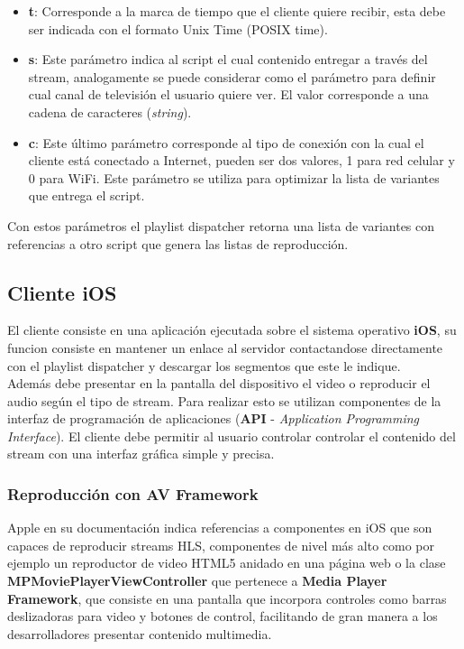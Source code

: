 \begin{itemize}
	\item \textbf{t}: Corresponde a la marca de tiempo que el cliente quiere recibir, esta debe ser indicada con el formato Unix Time (POSIX time).
	\item \textbf{s}: Este parámetro indica al script el cual contenido entregar a través del stream, analogamente se puede considerar como el parámetro para definir cual canal de televisión el usuario quiere ver. El valor corresponde a una cadena de caracteres (\textit{string}).
	\item \textbf{c}: Este último parámetro corresponde al tipo de conexión con la cual el cliente está conectado a Internet, pueden ser dos valores, 1 para red celular y 0 para WiFi. Este parámetro se utiliza para optimizar la lista de variantes que entrega el script.
\end{itemize}
		
Con estos parámetros el playlist dispatcher retorna una lista de variantes con referencias a otro script que genera las listas de reproducción.
		
	\subsection{Cliente iOS}
El cliente consiste en una aplicación ejecutada sobre el sistema operativo \textbf{iOS}, su funcion consiste en mantener un enlace al servidor contactandose directamente con el playlist dispatcher y descargar los segmentos que este le indique.\\

Además debe presentar en la pantalla del dispositivo el video o reproducir el audio según el tipo de stream. Para realizar esto se utilizan componentes de la interfaz de programación de aplicaciones (\textbf{API} - \textit{Application Programming Interface}). El cliente debe permitir al usuario controlar controlar el contenido del stream con una interfaz gráfica simple y precisa.

		\subsubsection{Reproducción con AV Framework}
Apple en su documentación indica referencias a componentes en iOS que son capaces de reproducir streams HLS, componentes de nivel más alto como por ejemplo un reproductor de video HTML5 anidado en una página web o la clase \textbf{MPMoviePlayerViewController} que pertenece a \textbf{Media Player Framework}, que consiste en una pantalla que incorpora controles como barras deslizadoras para video y botones de control, facilitando de gran manera a los desarrolladores presentar contenido multimedia. \\

